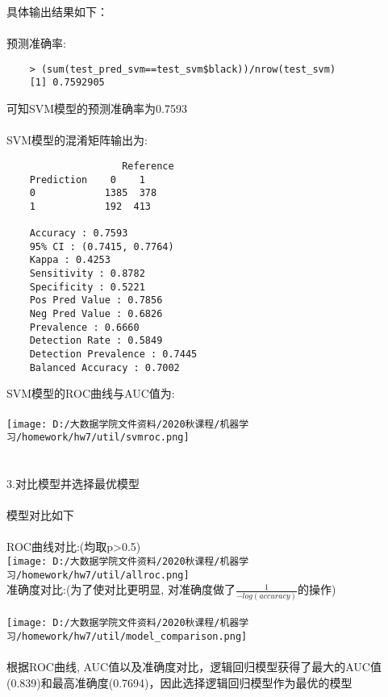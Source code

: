 \documentclass[]{article}
\begin{document}
具体输出结果如下：\\\\
预测准确率:
\begin{lstlisting}
	> (sum(test_pred_svm==test_svm$black))/nrow(test_svm)
	[1] 0.7592905
\end{lstlisting}
可知SVM模型的预测准确率为0.7593\\\\
SVM模型的混淆矩阵输出为:
\begin{lstlisting}
	                Reference
	Prediction    0    1
	0            1385  378
	1            192  413
	
	Accuracy : 0.7593          
	95% CI : (0.7415, 0.7764)
	Kappa : 0.4253          
	Sensitivity : 0.8782          
	Specificity : 0.5221          
	Pos Pred Value : 0.7856          
	Neg Pred Value : 0.6826          
	Prevalence : 0.6660          
	Detection Rate : 0.5849          
	Detection Prevalence : 0.7445          
	Balanced Accuracy : 0.7002                  
\end{lstlisting}
SVM模型的ROC曲线与AUC值为:\\\\
\texttt{[image: D:/大数据学院文件资料/2020秋课程/机器学习/homework/hw7/util/svmroc.png]}\\\\\\
3.对比模型并选择最优模型\\\\
模型对比如下\\\\
ROC曲线对比:(均取p>0.5)\\
\texttt{[image: D:/大数据学院文件资料/2020秋课程/机器学习/homework/hw7/util/allroc.png]}\\
准确度对比:(为了使对比更明显, 对准确度做了$\frac{1}{-log(accuracy)}$的操作)\\\\
\texttt{[image: D:/大数据学院文件资料/2020秋课程/机器学习/homework/hw7/util/model\_comparison.png]}\\\\
根据ROC曲线, AUC值以及准确度对比，逻辑回归模型获得了最大的AUC值(0.839)和最高准确度(0.7694)，因此选择逻辑回归模型作为最优的模型
\end{document}
